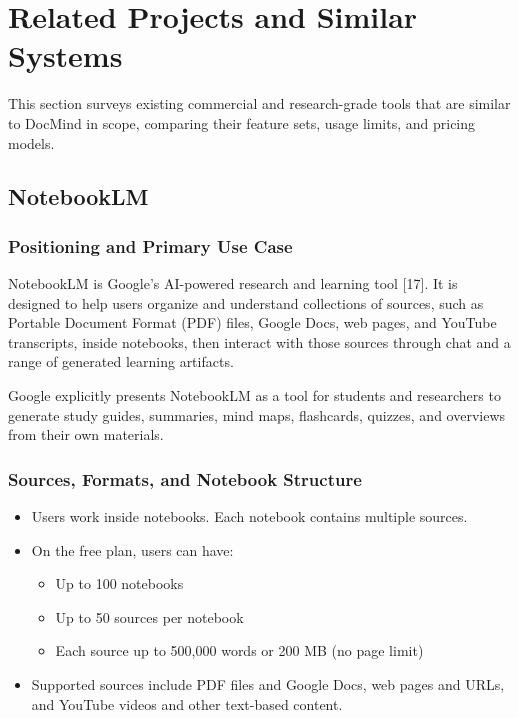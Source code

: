 \documentclass[12pt, a4paper, oneside]{report}
\let\oldsection\section
\renewcommand{\section}{%
  \addtocontents{toc}{\protect\needspace{4\baselineskip}}%
  \oldsection
}
\let\oldsubsection\subsection
\renewcommand{\subsection}{%
  \addtocontents{toc}{\protect\needspace{3\baselineskip}}%
  \oldsubsection
}
\begin{document}
\newpage

\section{Related Projects and Similar Systems}

This section surveys existing commercial and research-grade tools that are similar to DocMind in scope, comparing their feature sets, usage limits, and pricing models.

\subsection{NotebookLM}

\subsubsection{Positioning and Primary Use Case}

NotebookLM is Google's AI-powered research and learning tool [17]. It is designed to help users organize and understand collections of sources, such as Portable Document Format (PDF) files, Google Docs, web pages, and YouTube transcripts, inside notebooks, then interact with those sources through chat and a range of generated learning artifacts.

Google explicitly presents NotebookLM as a tool for students and researchers to generate study guides, summaries, mind maps, flashcards, quizzes, and overviews from their own materials.
\newpage

\subsubsection{Sources, Formats, and Notebook Structure}

\begin{itemize}
  \item Users work inside notebooks. Each notebook contains multiple sources.
  \item On the free plan, users can have:
    \begin{itemize}
      \item Up to 100 notebooks
      \item Up to 50 sources per notebook
      \item Each source up to 500,000 words or 200 MB (no page limit)
    \end{itemize}
  \item Supported sources include PDF files and Google Docs, web pages and URLs, and YouTube videos and other text-based content.
\end{itemize}
\end{document}
